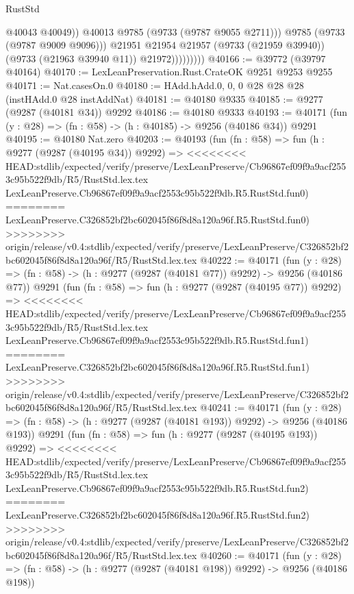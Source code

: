 \begin{lexlean}{RustStd}
\begin{coremodule}
{\begin{coremodule}
{{{{{{{{{{{{{{{{{{{{{{{{{{{{{{{{{{{{{{{{{{{{{{{{{{{{{{{                              @40043
                              @40049))
                          @40013
                          @9785
                          (@9733 (@9787 @9055 @2711)))
                        @9785
                        (@9733 (@9787 @9009 @9096)))
                      @21951
                      @21954
                      @21957
                      (@9733 (@21959 @39940))
                      (@9733 (@21963 @39940 @11))
                      @21972)))))))))
@40166 := @39772 (@39797 @40164)
@40170 := LexLeanPreservation.Rust.CrateOK @9251 @9253 @9255
@40171 := Nat.casesOn.{0}
@40180 := HAdd.hAdd.{0, 0, 0} @28 @28 @28 (instHAdd.{0} @28 instAddNat)
@40181 := @40180 @9335
@40185 := @9277 (@9287 (@40181 @34)) @9292
@40186 := @40180 @9333
@40193 := @40171 (fun (y : @28) => (fn : @58) -> (h : @40185) -> @9256 (@40186 @34)) @9291
@40195 := @40180 Nat.zero
@40203 := @40193
    (fun (fn : @58) =>
    fun (h : @9277 (@9287 (@40195 @34)) @9292) =>
<<<<<<<< HEAD:stdlib/expected/verify/preserve/LexLeanPreserve/Cb96867ef09f9a9acf2553c95b522f9db/R5/RustStd.lex.tex
    LexLeanPreserve.Cb96867ef09f9a9acf2553c95b522f9db.R5.RustStd.fun0)
========
    LexLeanPreserve.C326852bf2bc602045f86f8d8a120a96f.R5.RustStd.fun0)
>>>>>>>> origin/release/v0.4:stdlib/expected/verify/preserve/LexLeanPreserve/C326852bf2bc602045f86f8d8a120a96f/R5/RustStd.lex.tex
@40222 := @40171
    (fun (y : @28) => (fn : @58) -> (h : @9277 (@9287 (@40181 @77)) @9292) -> @9256 (@40186 @77))
    @9291
    (fun (fn : @58) =>
    fun (h : @9277 (@9287 (@40195 @77)) @9292) =>
<<<<<<<< HEAD:stdlib/expected/verify/preserve/LexLeanPreserve/Cb96867ef09f9a9acf2553c95b522f9db/R5/RustStd.lex.tex
    LexLeanPreserve.Cb96867ef09f9a9acf2553c95b522f9db.R5.RustStd.fun1)
========
    LexLeanPreserve.C326852bf2bc602045f86f8d8a120a96f.R5.RustStd.fun1)
>>>>>>>> origin/release/v0.4:stdlib/expected/verify/preserve/LexLeanPreserve/C326852bf2bc602045f86f8d8a120a96f/R5/RustStd.lex.tex
@40241 := @40171
    (fun (y : @28) => (fn : @58) -> (h : @9277 (@9287 (@40181 @193)) @9292) -> @9256 (@40186 @193))
    @9291
    (fun (fn : @58) =>
    fun (h : @9277 (@9287 (@40195 @193)) @9292) =>
<<<<<<<< HEAD:stdlib/expected/verify/preserve/LexLeanPreserve/Cb96867ef09f9a9acf2553c95b522f9db/R5/RustStd.lex.tex
    LexLeanPreserve.Cb96867ef09f9a9acf2553c95b522f9db.R5.RustStd.fun2)
========
    LexLeanPreserve.C326852bf2bc602045f86f8d8a120a96f.R5.RustStd.fun2)
>>>>>>>> origin/release/v0.4:stdlib/expected/verify/preserve/LexLeanPreserve/C326852bf2bc602045f86f8d8a120a96f/R5/RustStd.lex.tex
@40260 := @40171
    (fun (y : @28) => (fn : @58) -> (h : @9277 (@9287 (@40181 @198)) @9292) -> @9256 (@40186 @198))
}}}}}}}}}}}}}}}}}}}}}}}}}}}}}}}}}}}}}}}}}}}}}}}}}}}}}}}
\end{coremodule}}
\end{coremodule}
\end{lexlean}
